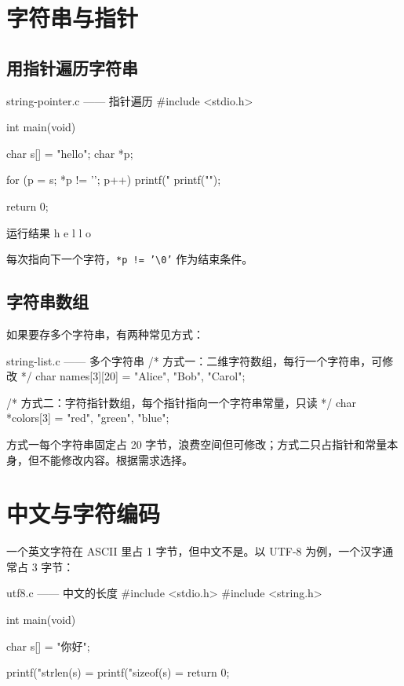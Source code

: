 \section{字符串与指针}

\subsection{用指针遍历字符串}

\begin{codebox}{string-pointer.c —— 指针遍历}
#include <stdio.h>

int main(void)
{
    char s[] = "hello";
    char *p;

    for (p = s; *p != '\0'; p++) {
        printf("%
    }
    printf("\n");

    return 0;
}
\end{codebox}

\begin{outbox}{运行结果}
h e l l o
\end{outbox}

 每次指向下一个字符，\texttt{*p != '\textbackslash0'} 作为结束条件。

\subsection{字符串数组}

如果要存多个字符串，有两种常见方式：

\begin{codebox}{string-list.c —— 多个字符串}
/* 方式一：二维字符数组，每行一个字符串，可修改 */
char names[3][20] = {"Alice", "Bob", "Carol"};

/* 方式二：字符指针数组，每个指针指向一个字符串常量，只读 */
char *colors[3] = {"red", "green", "blue"};
\end{codebox}

方式一每个字符串固定占 20 字节，浪费空间但可修改；方式二只占指针和常量本身，但不能修改内容。根据需求选择。

\section{中文与字符编码}

一个英文字符在 ASCII 里占 1 字节，但中文不是。以 UTF-8 为例，一个汉字通常占 3 字节：

\begin{codebox}{utf8.c —— 中文的长度}
#include <stdio.h>
#include <string.h>

int main(void)
{
    char s[] = "你好";

    printf("strlen(s) = %
    printf("sizeof(s) = %
    return 0;
}
\end{codebox}

